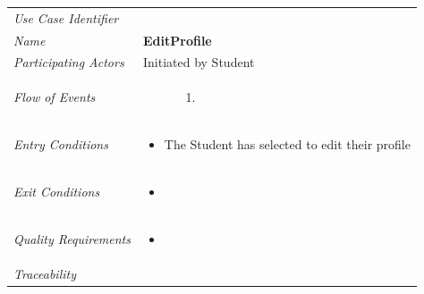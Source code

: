 \documentclass[12pt,letterpaper]{article}
\begin{document}
\begin{center}
	\begin{tabu} to 
		\toprule
		Use Case Identifier & \editprofile{} \\
		Name & {\bf EditProfile} \\
		Participating Actors & Initiated by Student \\
		Flow of Events & 
	    \begin{enumerate}[topsep=-1em, leftmargin=*]
		    \item[]
		    \begin{enumerate}[topsep=-1em, leftmargin=*]
		    		\item[1.]
		    \end{enumerate}
		\end{enumerate} \\

		Entry Conditions &
		\begin{itemize}[topsep=-1em, leftmargin=*]
		    \item The Student has selected to edit their profile
        \end{itemize} \\

		Exit Conditions &
		\begin{itemize}[topsep=-1em, leftmargin=*]
		    \item 
        \end{itemize} \\

		Quality Requirements &
		\begin{itemize}[topsep=-1em, leftmargin=*]
		    \item 
        \end{itemize} \\

		Traceability &  \\
		\toprule
	\end{tabu}
\end{center}
\end{document}

